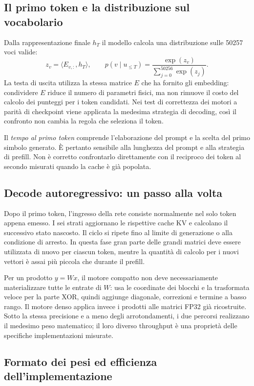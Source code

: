 \subsection{Il primo token e la distribuzione sul vocabolario}

Dalla rappresentazione finale $h_T$ il modello calcola una distribuzione sulle \num{50257} voci valide:
\[
z_v=\big\langle E_{v,:},h_T\big\rangle,\qquad
p(v\mid u_{\le T})=
\frac{\exp(z_v)}{\sum_{j=0}^{50256}\exp(z_j)}.
\]
La testa di uscita utilizza la stessa matrice $E$ che ha fornito gli embedding: condividere $E$ riduce il numero di parametri fisici, ma non rimuove il costo del calcolo dei punteggi per i token candidati. Nei test di correttezza dei motori a parità di checkpoint viene applicata la medesima strategia di decoding, così il confronto non cambia la regola che seleziona il token.

Il \emph{tempo al primo token} comprende l'elaborazione del prompt e la scelta del primo simbolo generato. È pertanto sensibile alla lunghezza del prompt e alla strategia di prefill. Non è corretto confrontarlo direttamente con il reciproco dei token al secondo misurati quando la cache è già popolata.

\subsection{Decode autoregressivo: un passo alla volta}

Dopo il primo token, l'ingresso della rete consiste normalmente nel solo token appena emesso. I sei strati aggiornano le rispettive cache KV e calcolano il successivo stato nascosto. Il ciclo si ripete fino al limite di generazione o alla condizione di arresto. In questa fase gran parte delle grandi matrici deve essere utilizzata di nuovo per ciascun token, mentre la quantità di calcolo per i nuovi vettori è assai più piccola che durante il prefill.

Per un prodotto $y=Wx$, il motore compatto non deve necessariamente materializzare tutte le entrate di $W$: usa le coordinate dei blocchi e la trasformata veloce per la parte XOR, quindi aggiunge diagonale, correzioni e termine a basso rango. Il motore denso applica invece i prodotti alle matrici FP32 già ricostruite. Sotto la stessa precisione e a meno degli arrotondamenti, i due percorsi realizzano il medesimo peso matematico; il loro diverso throughput è una proprietà delle specifiche implementazioni misurate.

\subsection{Formato dei pesi ed efficienza dell'implementazione}

